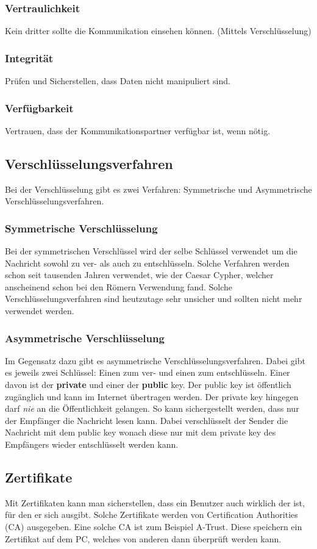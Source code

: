 \documentclass{article}
\begin{document}
	  \subsubsection{Vertraulichkeit}
	  Kein dritter sollte die Kommunikation einsehen können. (Mittels Verschlüsselung)
	  \subsubsection{Integrität}
	  Prüfen und Sicherstellen, dass Daten nicht manipuliert sind.
	  \subsubsection{Verfügbarkeit}
	  Vertrauen, dass der Kommunikationspartner verfügbar ist, wenn nötig.
	  \subsection{Verschlüsselungsverfahren}
	  Bei der Verschlüsselung gibt es zwei Verfahren: Symmetrische und Asymmetrische Verschlüsselungsverfahren.
	  \subsubsection{Symmetrische Verschlüsselung}
	  Bei der symmetrischen Verschlüssel wird der selbe Schlüssel verwendet um die Nachricht sowohl zu ver- als auch zu entschlüsseln. Solche Verfahren werden schon seit tausenden Jahren verwendet, wie der Caesar Cypher, welcher anscheinend schon bei den Römern Verwendung fand. Solche Verschlüsselungsverfahren sind heutzutage sehr unsicher und sollten nicht mehr verwendet werden.
	  \subsubsection{Asymmetrische Verschlüsselung}
	  Im Gegensatz dazu gibt es asymmetrische Verschlüsselungsverfahren. Dabei gibt es jeweils zwei Schlüssel: Einen zum ver- und einen zum entschlüsseln. Einer davon ist der \textbf{private} und einer der \textbf{public} key. Der public key ist öffentlich zugänglich und kann im Internet übertragen werden. Der private key hingegen darf \textit{nie} an die Öffentlichkeit gelangen. So kann sichergestellt werden, dass nur der Empfänger die Nachricht lesen kann. Dabei verschlüsselt der Sender die Nachricht mit dem public key wonach diese nur mit dem private key des Empfängers wieder entschlüsselt werden kann. \\
	  \subsection{Zertifikate}
	  Mit Zertifikaten kann man sicherstellen, dass ein Benutzer auch wirklich der ist, für den er sich ausgibt. Solche Zertifikate werden von Certification Authorities (CA) ausgegeben. Eine solche CA ist zum Beispiel A-Trust. Diese speichern ein Zertifikat auf dem PC, welches von anderen dann überprüft werden kann.
\end{document}
